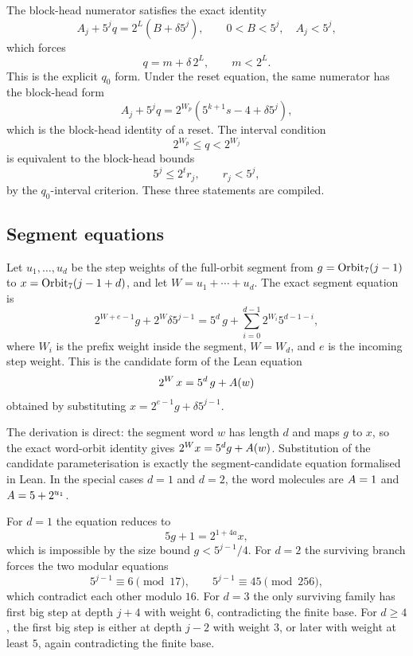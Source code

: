 The block-head numerator satisfies the exact identity
\begin{equation*}
  A_j+5^jq=2^L\left(B+\delta5^j\right),
\qquad 0<B<5^j,\quad A_j<5^j,
\end{equation*}
which forces
\begin{equation*}
  q=m+\delta\,2^L,\qquad m<2^L.
\end{equation*}
This is the explicit $q_0$ form.  Under the reset equation, the same
numerator has the block-head form
\begin{equation*}
  A_j+5^jq
    =2^{W_p}\left(5^{k+1}s-4+\delta5^j\right),
\end{equation*}
which is the block-head identity of a reset.  The interval
condition
\begin{equation*}
  2^{W_p}\le q<2^{W_j}
\end{equation*}
is equivalent to the block-head bounds
\begin{equation*}
  5^j\le2^t r_j,\qquad r_j<5^j,
\end{equation*}
by the $q_0$-interval criterion.  These three statements are
compiled.

\subsection{Segment equations}

Let $u_1,\dots,u_d$ be the step weights of the full-orbit segment from
$g=\mathrm{Orbit}_7(j-1)$ to $x=\mathrm{Orbit}_7(j-1+d)$, and let
$W=u_1+\cdots+u_d$.  The exact segment equation is
\begin{equation*}
  2^{W+e-1}g+2^W\delta5^{j-1}
    =5^d\,g+\sum_{i=0}^{d-1}2^{W_i}5^{d-1-i},
\end{equation*}
where $W_i$ is the prefix weight inside the segment, $W=W_d$, and $e$
is the incoming step weight.  This is the candidate form of the Lean
equation
\begin{equation*}
  2^W\,x=5^d\,g+A(w)
\end{equation*}
obtained by substituting $x=2^{e-1}g+\delta5^{j-1}$.

The derivation is direct: the segment word $w$ has length $d$ and maps
$g$ to $x$, so the exact word-orbit identity gives
$2^Wx=5^dg+A(w)$.  Substitution of the candidate parameterisation
is exactly the segment-candidate equation formalised in Lean.  In the
special cases
$d=1$ and $d=2$, the word molecules are $A=1$ and
$A=5+2^{u_1}$.

For $d=1$ the equation reduces to
\begin{equation*}
  5g+1=2^{1+4a}x,
\end{equation*}
which is impossible by the size bound $g<5^{j-1}/4$.  For $d=2$ the
surviving branch forces the two modular equations
\begin{equation*}
  5^{j-1}\equiv6\pmod{17},\qquad
  5^{j-1}\equiv45\pmod{256},
\end{equation*}
which contradict each other modulo $16$.  For $d=3$ the only surviving
family has first big step at depth $j+4$ with weight $6$, contradicting
the finite base.  For $d\ge4$, the first big step is either at depth
$j-2$ with weight $3$, or later with weight at least $5$, again
contradicting the finite base.

